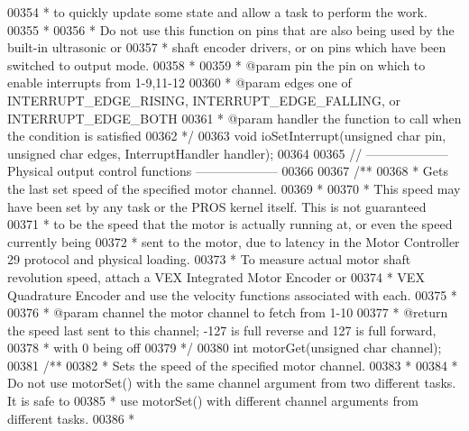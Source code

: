 \begin{DoxyCode}
00354 \textcolor{comment}{ * to quickly update some state and allow a task to perform the work.}
00355 \textcolor{comment}{ *}
00356 \textcolor{comment}{ * Do not use this function on pins that are also being used by the built-in ultrasonic or}
00357 \textcolor{comment}{ * shaft encoder drivers, or on pins which have been switched to output mode.}
00358 \textcolor{comment}{ *}
00359 \textcolor{comment}{ * @param pin the pin on which to enable interrupts from 1-9,11-12}
00360 \textcolor{comment}{ * @param edges one of INTERRUPT\_EDGE\_RISING, INTERRUPT\_EDGE\_FALLING, or INTERRUPT\_EDGE\_BOTH}
00361 \textcolor{comment}{ * @param handler the function to call when the condition is satisfied}
00362 \textcolor{comment}{ */}
00363 \textcolor{keywordtype}{void} ioSetInterrupt(\textcolor{keywordtype}{unsigned} \textcolor{keywordtype}{char} pin, \textcolor{keywordtype}{unsigned} \textcolor{keywordtype}{char} edges, 
      InterruptHandler handler);
00364 
00365 \textcolor{comment}{// -------------------- Physical output control functions --------------------}
00366 
00367 \textcolor{comment}{/**}
00368 \textcolor{comment}{ * Gets the last set speed of the specified motor channel.}
00369 \textcolor{comment}{ *}
00370 \textcolor{comment}{ * This speed may have been set by any task or the PROS kernel itself. This is not guaranteed}
00371 \textcolor{comment}{ * to be the speed that the motor is actually running at, or even the speed currently being}
00372 \textcolor{comment}{ * sent to the motor, due to latency in the Motor Controller 29 protocol and physical loading.}
00373 \textcolor{comment}{ * To measure actual motor shaft revolution speed, attach a VEX Integrated Motor Encoder or}
00374 \textcolor{comment}{ * VEX Quadrature Encoder and use the velocity functions associated with each.}
00375 \textcolor{comment}{ *}
00376 \textcolor{comment}{ * @param channel the motor channel to fetch from 1-10}
00377 \textcolor{comment}{ * @return the speed last sent to this channel; -127 is full reverse and 127 is full forward,}
00378 \textcolor{comment}{ * with 0 being off}
00379 \textcolor{comment}{ */}
00380 \textcolor{keywordtype}{int} motorGet(\textcolor{keywordtype}{unsigned} \textcolor{keywordtype}{char} channel);
00381 \textcolor{comment}{/**}
00382 \textcolor{comment}{ * Sets the speed of the specified motor channel.}
00383 \textcolor{comment}{ *}
00384 \textcolor{comment}{ * Do not use motorSet() with the same channel argument from two different tasks. It is safe to}
00385 \textcolor{comment}{ * use motorSet() with different channel arguments from different tasks.}
00386 \textcolor{comment}{ *}

\end{DoxyCode}
